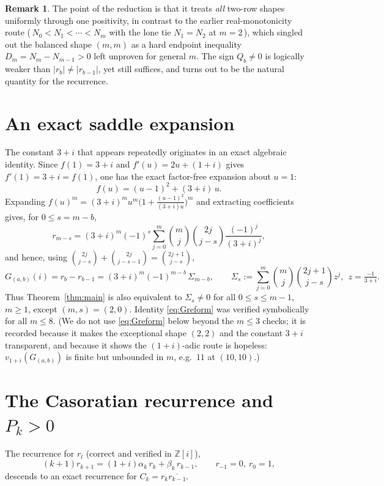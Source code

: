 \documentclass[11pt]{article}
\theoremstyle{definition}
\newtheorem{remark}{Remark}
\newcommand{\Z}{\mathbb{Z}}
\newcommand{\Zi}{\Z[i]}
\begin{document}
\begin{remark}
The point of the reduction is that it treats \emph{all} two-row shapes uniformly
through one positivity, in contrast to the earlier real-monotonicity route
(\,$N_0<N_1<\cdots<N_m$ with the lone tie $N_1=N_2$ at $m=2$\,), which singled out
the balanced shape $(m,m)$ as a hard endpoint inequality $D_m=N_m-N_{m-1}>0$ left
unproven for general $m$.  The sign $Q_b\neq0$ is logically weaker than
$|r_b|\neq|r_{b-1}|$, yet still suffices, and turns out to be the natural quantity
for the recurrence.
\end{remark}

\section{An exact saddle expansion}\label{sec:saddle}

The constant $3+i$ that appears repeatedly originates in an exact algebraic
identity.  Since $f(1)=3+i$ and $f'(u)=2u+(1+i)$ gives $f'(1)=3+i=f(1)$, one has
the exact factor-free expansion about $u=1$:
\begin{equation}\label{eq:saddle}
  f(u)=(u-1)^2+(3+i)\,u .
\end{equation}
Expanding $f(u)^m=(3+i)^mu^m\big(1+\tfrac{(u-1)^2}{(3+i)u}\big)^m$ and extracting
coefficients gives, for $0\le s=m-b$,
\[
  r_{m-s}=(3+i)^m(-1)^s\sum_{j=0}^m\binom mj\binom{2j}{j-s}\frac{(-1)^j}{(3+i)^j},
\]
and hence, using $\binom{2j}{j-s}+\binom{2j}{j-s-1}=\binom{2j+1}{j-s}$,
\begin{equation}\label{eq:Greform}
  G_{(a,b)}(i)=r_b-r_{b-1}=(3+i)^m(-1)^{m-b}\,\Sigma_{m-b},\qquad
  \Sigma_s:=\sum_{j=0}^m\binom mj\binom{2j+1}{j-s}z^j,\ \ z=\tfrac{-1}{3+i}.
\end{equation}
Thus Theorem~\ref{thm:main} is also equivalent to $\Sigma_s\neq0$ for all
$0\le s\le m-1$, $m\ge1$, except $(m,s)=(2,0)$.  Identity \eqref{eq:Greform} was
verified symbolically for all $m\le8$.  (We do not use \eqref{eq:Greform} below
beyond the $m\le3$ checks; it is recorded because it makes the exceptional shape
$(2,2)$ and the constant $3+i$ transparent, and because it shows the
$(1+i)$-adic route is hopeless: $v_{1+i}(G_{(a,b)})$ is finite but unbounded in
$m$, e.g.\ $11$ at $(10,10)$.)

\section{The Casoratian recurrence and $P_k>0$}

The recurrence for $r_l$ (correct and verified in $\Zi$),
\begin{equation}\label{eq:rrec}
  (k+1)r_{k+1}=(1+i)\alpha_k\,r_k+\beta_k\,r_{k-1},\qquad r_{-1}=0,\ r_0=1,
\end{equation}
descends to an exact recurrence for $C_k=r_k\overline{r_{k-1}}$.
\end{document}
